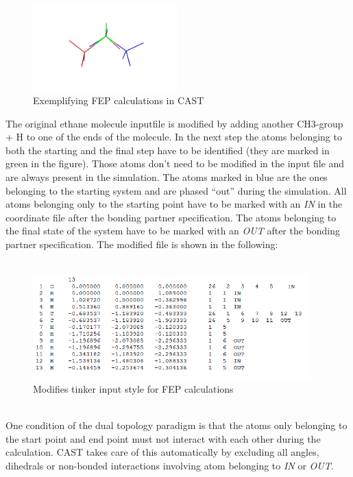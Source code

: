 \documentclass[10pt,a4paper]{article} %
\begin{document}
	\begin{figure}[h]
		\centering
		\includegraphics[width=0.5\textwidth]{img/imgfep1.png}
		\caption{Exemplifying \ac{FEP} calculations in \ac{CAST}}
		\label{fig:FEP1}
	\end{figure}
	The original ethane molecule inputfile is modified by adding another CH3-group + H to one of the ends of the molecule. In the next step the atoms belonging to both the starting and the final step have to be identified (they are marked in green in the figure). Those atoms don't need to be modified in the input file and are always present in the simulation. The atoms marked in blue are the ones belonging to the starting system and are phased ``out'' during the simulation. All atoms belonging only to the starting point have to be marked with an \textit{IN} in the coordinate file after the bonding partner specification. The atoms belonging to the final state of the system have to be marked with an \textit{OUT} after the bonding partner specification. The modified file is shown in the following:\\~\\
	\begin{figure}[h]
		\centering
		\includegraphics[width=0.95\textwidth]{img/imgfep2.png}
		\caption{Modifies tinker input style for \ac{FEP} calculations}
		\label{fig:FEP2}
	\end{figure}~\\
	One condition of the dual topology paradigm is that the atoms only belonging to the start point and end point must not interact with each other during the calculation. \ac{CAST} takes care of this automatically by excluding all angles, dihedrals or non-bonded interactions involving atom belonging to \textit{IN} or \textit{OUT}.\supercite{becker_development_2015}
	
\end{document}
